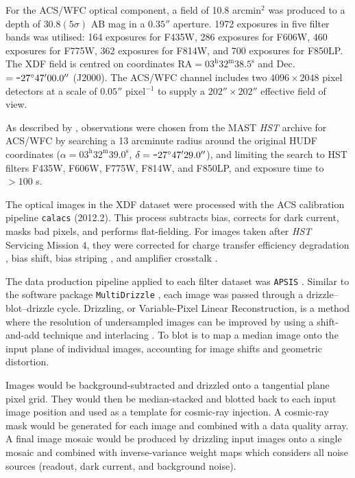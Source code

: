 \documentclass[12pt, twocolumn, nofootinbib]{revtex4-1}    %
\def\Minus{\texttt{-}}
\begin{document}
For the ACS/WFC optical component, a field of 10.8 arcmin$^2$ was produced to a depth of $30.8(5\sigma)$ AB mag in a $0.35''$ aperture. 1972 exposures in five filter bands was utilised: 164 exposures for F435W, 286 exposures for F606W, 460 exposures for F775W, 362 exposures for F814W, and 700 exposures for F850LP. The XDF field is centred on coordinates RA$=03^{\text{h}} 32^{\text{m}}38.5^\text{s}$ and Dec.$=\Minus 27 \degree 47 ' 00.0''$ (J2000). The ACS/WFC channel includes two $4096 \times 2048$ pixel detectors at a scale of $0.05''$ pixel$^{-1}$ to supply a $202'' \times 202''$ effective field of view. 

As described by \cite{2013ApJS..209....6I}, observations were chosen from the MAST \textit{HST} archive for ACS/WFC by searching a 13 arcminute radius around the original HUDF coordinates ($\alpha=03^{\text{h}} 32^{\text{m}}39.0^\text{s}$, $\delta=\Minus 27 \degree 47 ' 29.0''$), and limiting the search to HST filters F435W, F606W, F775W, F814W, and F850LP, and exposure time to $>100$ s. 

The optical images in the XDF dataset were processed with the ACS calibration pipeline \texttt{calacs} (2012.2). This process subtracts bias, corrects for dark current, masks bad pixels, and performs flat-fielding. For images taken after \textit{HST} Servicing Mission 4, they were corrected for charge transfer efficiency degradation \citep{2010PASP..122.1035A}, bias shift, bias striping \citep{2010hstc.workE..54G}, and amplifier crosstalk \citep{2010hstc.workE..55S}. 

The data production pipeline applied to each filter dataset was \texttt{APSIS} \citep{2003ASPC..295..257B}. Similar to the software package \texttt{MultiDrizzle} \citep{2003hstc.conf.....A}, each image was passed through a drizzle--blot--drizzle cycle. Drizzling, or Variable-Pixel Linear Reconstruction, is a method where the resolution of undersampled images can be improved by using a shift-and-add technique and interlacing \citep{2002PASP..114..144F}. To blot is to map a median image onto the input plane of individual images, accounting for image shifts and geometric distortion. 

Images would be background-subtracted and drizzled onto a tangential plane pixel grid. They would then be median-stacked and blotted back to each input image position and used as a template for cosmic-ray injection. A cosmic-ray mask would be generated for each image and combined with a data quality array. A final image mosaic would be produced by drizzling input images onto a single mosaic and combined with inverse-variance weight maps which considers all noise sources (readout, dark current, and background noise). 
\end{document}
